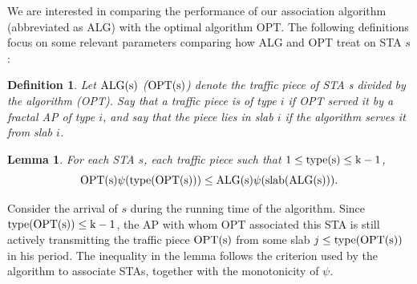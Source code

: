 \documentclass[conference]{IEEEtran}
\newtheorem{definition}{Definition}
\newtheorem{lemma}{Lemma}
\def \OPT {\rm{OPT}}
\def \ALG {\rm{ALG}}
\def \slab {\rm{slab}}
\def \type {\rm{type}}
\begin{document}
  We are interested in comparing the performance of our association algorithm (abbreviated as ALG) with the optimal algorithm OPT.  The following definitions focus on some relevant parameters comparing how ALG and OPT treat on STA $s$:
  \begin{definition}
    Let $\ALG(s)$ ($\OPT(s)$) denote the traffic piece of STA \textit{s} divided by the algorithm (OPT).  Say that a traffic piece is of type $i$ if OPT served it by a fractal AP of type $i$, and say that the piece lies in slab $i$ if the algorithm serves it from slab $i$.
  \end{definition}
  \begin{lemma}\label{lemma:6}
    For each STA $s$, each traffic piece such that $1\leq\type(s)\leq k-1$,
    \begin{equation*}
    \OPT(s)\psi(\type(\OPT(s)))\leq \ALG(s)\psi(\slab(\ALG(s))).
    \end{equation*}
  \end{lemma}
  \begin{IEEEproof}
    Consider the arrival of $s$ during the running time of the algorithm.  Since $\type(\OPT(s))\leq k-1$, the AP with whom OPT associated this STA is still actively transmitting the traffic piece $\OPT(s)$ from some slab $j\leq \type(\OPT(s))$ in his period.  The inequality in the lemma follows the criterion used by the algorithm to associate STAs, together with the monotonicity of $\psi$.
  \end{IEEEproof}
\end{document}
